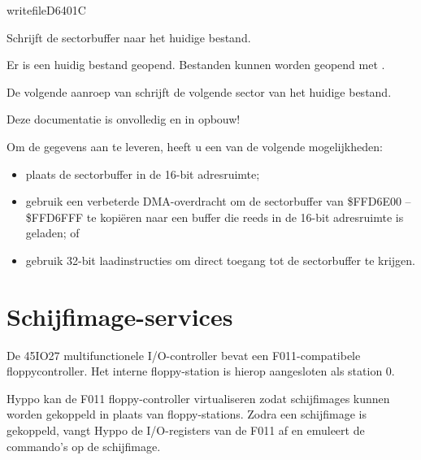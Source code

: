 \newpage
\begin{hyppotrap}{writefile}{D640}{1C}

\item [Dienst:]  Schrijft de sectorbuffer naar het huidige bestand.
\item [Voorbeding:]  Er is een huidig bestand geopend. Bestanden kunnen worden geopend met .
\item [Nawerking:]  De volgende aanroep van  schrijft de volgende sector van het huidige  bestand.
\item [Foutcodes:]  
\item [Geschiedenis:]
\item [Opmerkingen:]  Deze documentatie is onvolledig en in opbouw!

  Om de gegevens aan te leveren, heeft u een van de volgende mogelijkheden:
  \begin{itemize}
    
\item plaats de sectorbuffer in de 16-bit adresruimte;    
\item gebruik een verbeterde DMA-overdracht om de sectorbuffer van          \$FFD6E00 -- \$FFD6FFF te kopiëren naar een buffer die reeds in de 16-bit          adresruimte is geladen; of    
\item gebruik 32-bit laadinstructies om direct toegang tot de sectorbuffer te krijgen.
  \end{itemize}
\end{hyppotrap}



\newpage
\section{Schijfimage-services}

De 45IO27 multifunctionele I/O-controller bevat een F011-compatibele floppycontroller. Het interne floppy-station is hierop aangesloten als station 0.

Hyppo kan de F011 floppy-controller virtualiseren zodat schijfimages  kunnen worden gekoppeld in plaats van floppy-stations. Zodra een schijfimage is gekoppeld, vangt Hyppo de I/O-registers van de F011 af en emuleert de commando's op de schijfimage.

